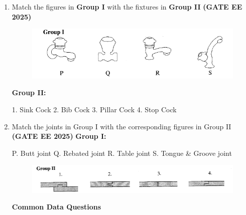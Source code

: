\documentclass[journal,12pt,onecolumn]{IEEEtran}
\theoremstyle{remark}
\begin{document}
{\begin{enumerate}
\begin{enumerate}
\end{enumerate}
\item  Match the figures in \textbf{Group I} with the fixtures in \textbf{Group II} \hfill \textbf{(GATE EE 2025)}
\begin{figure}
    \centering
    \includegraphics[width=0.5\linewidth]{figs/fig3.png}
    \caption{}
    \label{fig3}
\end{figure}
\textbf{Group II:} 
\begin{multicols}{4}
1. Sink Cock 
2. Bib Cock 
3. Pillar Cock
4. Stop Cock 
\end{multicols}

\begin{enumerate}
\end{enumerate}
\item  Match the joints in Group I with the corresponding figures in Group II \hfill \textbf{(GATE EE 2025)}
\textbf{Group I:} 
\begin{multicols}{4}
P. Butt joint 
Q. Rebated joint
R. Table joint 
S. Tongue \& Groove joint 
\end{multicols}
\begin{figure}[H]
    \centering
    \includegraphics[width=0.5\linewidth]{figs/fig4.png}
    \caption{}
    \label{fig4}
\end{figure}
\begin{enumerate}
\end{enumerate}
\textbf{Common Data Questions}


\end{enumerate}}
\end{document}
